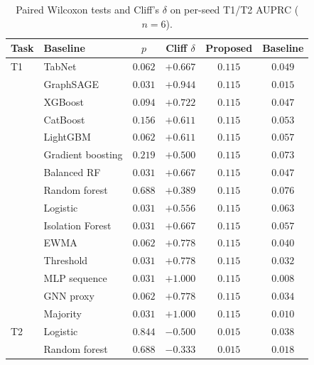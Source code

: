 \begin{table}[!t]
\centering
\caption{Paired Wilcoxon tests and Cliff's $\delta$ on per-seed T1/T2 AUPRC ($n{=}6$).}
\label{tab:sig}
\renewcommand{\arraystretch}{1.1}
\setlength{\tabcolsep}{3.5pt}
{\footnotesize\begin{tabular*}{\textwidth}{@{\extracolsep{\fill}}llcccc}
\toprule
Task & Baseline & $p$ & Cliff $\delta$ & Proposed & Baseline \\
\midrule
T1 & TabNet & $0.062$ & $+0.667$ & $0.115$ & $0.049$ \\
 & GraphSAGE & $0.031$ & $+0.944$ & $0.115$ & $0.015$ \\
 & XGBoost & $0.094$ & $+0.722$ & $0.115$ & $0.047$ \\
 & CatBoost & $0.156$ & $+0.611$ & $0.115$ & $0.053$ \\
 & LightGBM & $0.062$ & $+0.611$ & $0.115$ & $0.057$ \\
 & Gradient boosting & $0.219$ & $+0.500$ & $0.115$ & $0.073$ \\
 & Balanced RF & $0.031$ & $+0.667$ & $0.115$ & $0.047$ \\
 & Random forest & $0.688$ & $+0.389$ & $0.115$ & $0.076$ \\
 & Logistic & $0.031$ & $+0.556$ & $0.115$ & $0.063$ \\
 & Isolation Forest & $0.031$ & $+0.667$ & $0.115$ & $0.057$ \\
 & EWMA & $0.062$ & $+0.778$ & $0.115$ & $0.040$ \\
 & Threshold & $0.031$ & $+0.778$ & $0.115$ & $0.032$ \\
 & MLP sequence & $0.031$ & $+1.000$ & $0.115$ & $0.008$ \\
 & GNN proxy & $0.062$ & $+0.778$ & $0.115$ & $0.034$ \\
 & Majority & $0.031$ & $+1.000$ & $0.115$ & $0.010$ \\
T2 & Logistic & $0.844$ & $-0.500$ & $0.015$ & $0.038$ \\
 & Random forest & $0.688$ & $-0.333$ & $0.015$ & $0.018$ \\
\bottomrule
\end{tabular*}}
\end{table}
